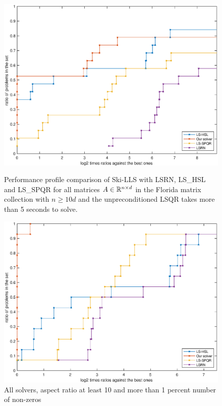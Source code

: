 \documentclass[english,11pt]{article}
\begin{document}
\begin{figure}[]
    \centering
    \begin{minipage}{\mysize\textwidth}
        \centering
        \includegraphics[width=\textwidth]{images/sparse_florida_lsqr_5_asp_10.eps} %
        \caption{Performance profile comparison of Ski-LLS with LSRN, LS_HSL and LS_SPQR for all matrices $A\in\mathbb{R}^{n\times d}$ in the Florida matrix collection with $n\geq 10d$ and the unpreconditioned LSQR takes more than 5 seconds to solve.}
        \label{fig::all_solver_10_LSQR_5}
    \end{minipage}\hfill  
    \begin{minipage}{\mysize\textwidth}
    \centering
    \includegraphics[width=\textwidth]{images/asp10_density_001.eps}
    \caption{All solvers, aspect ratio at least 10 and more than 1 percent number of non-zeros}
    \label{fig::density001}
    \end{minipage}

\end{figure}
\end{document}
